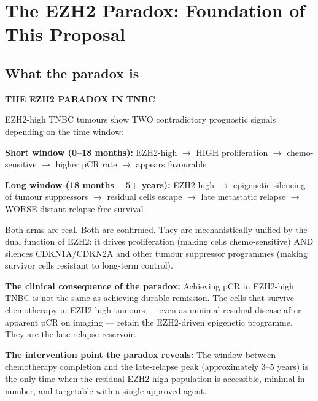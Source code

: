 \documentclass[12pt, a4paper]{article}
\begin{document}
\section{The EZH2 Paradox: Foundation of This Proposal}

\subsection{What the paradox is}

\begin{center}
\colorbox{paradoxbox}{
\begin{minipage}{0.85\textwidth}
\vspace{0.5em}
\textbf{THE EZH2 PARADOX IN TNBC}

\medskip
EZH2-high TNBC tumours show TWO contradictory
prognostic signals depending on the time window:

\medskip
\textbf{Short window (0--18 months):}
EZH2-high $\rightarrow$ HIGH proliferation
$\rightarrow$ chemo-sensitive $\rightarrow$
higher pCR rate $\rightarrow$ appears favourable

\medskip
\textbf{Long window (18 months -- 5+ years):}
EZH2-high $\rightarrow$ epigenetic silencing
of tumour suppressors $\rightarrow$ residual cells
escape $\rightarrow$ late metastatic relapse
$\rightarrow$ WORSE distant relapse-free survival

\medskip
Both arms are real. Both are confirmed.
They are mechanistically unified by the dual
function of EZH2: it drives proliferation (making
cells chemo-sensitive) AND silences CDKN1A/CDKN2A
and other tumour suppressor programmes (making
survivor cells resistant to long-term control).

\medskip
\textbf{The clinical consequence of the paradox:}
Achieving pCR in EZH2-high TNBC is not the same
as achieving durable remission. The cells that
survive chemotherapy in EZH2-high tumours ---
even as minimal residual disease after apparent
pCR on imaging --- retain the EZH2-driven
epigenetic programme. They are the late-relapse
reservoir.

\textbf{The intervention point the paradox reveals:}
The window between chemotherapy completion and
the late-relapse peak (approximately 3--5 years)
is the only time when the residual EZH2-high
population is accessible, minimal in number, and
targetable with a single approved agent.
\vspace{0.5em}
\end{minipage}
}
\end{center}
\end{document}
